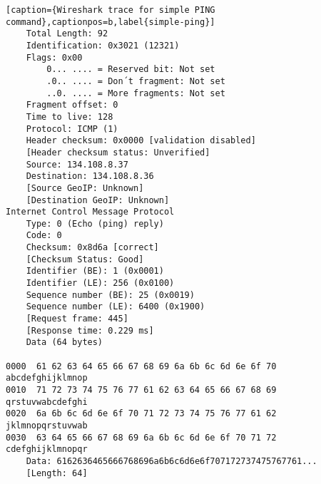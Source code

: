 \begin{lstlisting}[caption={Wireshark trace for simple PING command},captionpos=b,label{simple-ping}]
	Total Length: 92
	Identification: 0x3021 (12321)
	Flags: 0x00
		0... .... = Reserved bit: Not set
		.0.. .... = Don´t fragment: Not set
		..0. .... = More fragments: Not set
	Fragment offset: 0
	Time to live: 128
	Protocol: ICMP (1)
	Header checksum: 0x0000 [validation disabled]
	[Header checksum status: Unverified]
	Source: 134.108.8.37
	Destination: 134.108.8.36
	[Source GeoIP: Unknown]
	[Destination GeoIP: Unknown]
Internet Control Message Protocol
	Type: 0 (Echo (ping) reply)
	Code: 0
	Checksum: 0x8d6a [correct]
	[Checksum Status: Good]
	Identifier (BE): 1 (0x0001)
	Identifier (LE): 256 (0x0100)
	Sequence number (BE): 25 (0x0019)
	Sequence number (LE): 6400 (0x1900)
	[Request frame: 445]
	[Response time: 0.229 ms]
	Data (64 bytes)

0000  61 62 63 64 65 66 67 68 69 6a 6b 6c 6d 6e 6f 70   abcdefghijklmnop
0010  71 72 73 74 75 76 77 61 62 63 64 65 66 67 68 69   qrstuvwabcdefghi
0020  6a 6b 6c 6d 6e 6f 70 71 72 73 74 75 76 77 61 62   jklmnopqrstuvwab
0030  63 64 65 66 67 68 69 6a 6b 6c 6d 6e 6f 70 71 72   cdefghijklmnopqr
	Data: 6162636465666768696a6b6c6d6e6f707172737475767761...
	[Length: 64]
\end{lstlisting}
